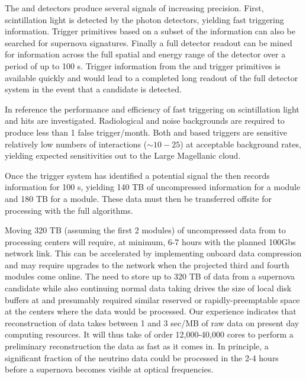 \documentclass[../main-v1.tex]{subfiles}
\begin{document}
The  and  detectors produce several signals of increasing precision.  First, scintillation light is detected by the photon detectors, yielding fast triggering information.  Trigger primitives based on a subset of the  information can also be searched for supernova signatures.  Finally a full detector readout can be mined for information across the full spatial and energy range of the detector over a period of up to 100 s.  Trigger information from the  and trigger primitives is available quickly and would lead to a completed long readout of the full detector system in the event that a candidate  is detected. 

In reference \cite{DUNE:2020zfm} the performance and efficiency of fast triggering on scintillation light and  hits are investigated.  Radiological and noise backgrounds are required to produce less than 1 false trigger/month. Both  and  based triggers are sensitive relatively low numbers of interactions ($\sim10-25$) at acceptable background rates, yielding expected sensitivities out to the Large Magellanic cloud.

Once the trigger system has identified a potential  signal  the  then records information for 100 s, yielding 140 TB of uncompressed information for a  module and 180 TB for a  module.  These data must then be transferred offsite for processing with the full algorithms. 




Moving  320 TB (assuming the first 2 modules) of uncompressed data   from  to processing centers will require, at minimum, 6-7 hours with the planned 100Gbs network link.  This can be accelerated by implementing onboard data compression and may require upgrades to the network when the projected third and fourth modules come online.  The need to store up to 320 TB of data from a supernova candidate while also continuing normal data taking drives the size of local disk buffers at  and presumably required similar reserved or rapidly-preemptable space at the centers where the data would be processed. Our  experience indicates that reconstruction of  data takes between 1 and 3 sec/MB of raw data on present day computing resources.  It will thus take of order 12,000-40,000 cores to perform a preliminary reconstruction the data as fast as it comes in. In principle, a significant fraction of the neutrino data could be processed  in the 2-4 hours before a supernova becomes visible at optical frequencies.
\end{document}
